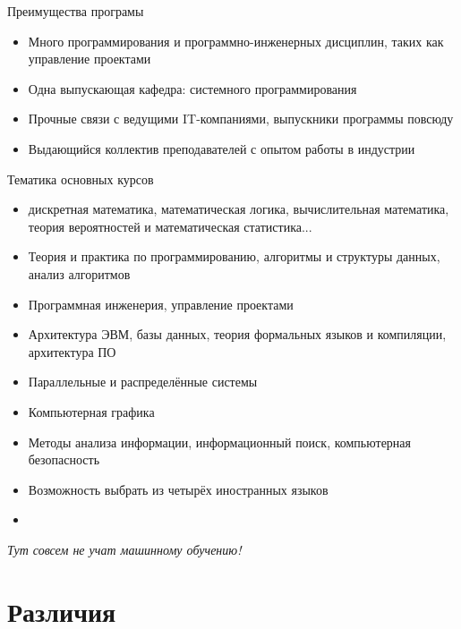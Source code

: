 \documentclass{slides-style}
\begin{document}
    \begin{frame}{Преимущества програмы}
        \begin{itemize}
            \item Много программирования и программно-инженерных дисциплин, таких как управление проектами
            \item Одна выпускающая кафедра: системного программирования
            \item Прочные связи с ведущими IT-компаниями, выпускники программы повсюду
            \item Выдающийся коллектив преподавателей с опытом работы в индустрии
        \end{itemize}
    \end{frame}

    \begin{frame}{Тематика основных курсов}
        \begin{itemize}
            \item дискретная математика, математическая логика, вычислительная математика, теория вероятностей и математическая статистика...
            \item Теория и практика по программированию, алгоритмы и структуры данных, анализ алгоритмов
            \item Программная инженерия, управление проектами
            \item Архитектура ЭВМ, базы данных, теория формальных языков и компиляции, архитектура ПО
            \item Параллельные и распределённые системы
            \item Компьютерная графика
            \item Методы анализа информации, информационный поиск, компьютерная безопасность
            \item Возможность выбрать из четырёх иностранных языков
            \item {}
        \end{itemize}

        \vspace{3mm}

        \emph{Тут совсем не учат машинному обучению!}
    \end{frame}

    \section{Различия}
\end{document}
